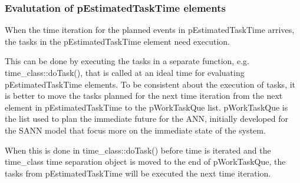 %




	\subsubsection{Evalutation of pEstimatedTaskTime elements}
	\label{ssecEvaluationOfpEstimatedTaskTimeELEMENTS}

	When the time iteration for the planned events in pEstimatedTaskTime arrives, the tasks in the pEstimatedTaskTime element need execution.

	This can be done by executing the tasks in a separate function, e.g. time\_class::doTask(), that is called at an ideal time for evaluating pEstimatedTaskTime elements.
	To be consistent about the execution of tasks, it is better to move the tasks planned for the next time iteration from the next element in pEstimatedTaskTime to the pWorkTaskQue list.
	pWorkTaskQue is the list used to plan the immediate future for the ANN, initially developed for the SANN model that focus more on the immediate state of the system.

	When this is done in time\_class::doTask() before time is iterated and the time\_class time separation object is moved to the end of pWorkTaskQue, the tasks from pEstimatedTaskTime will be executed the next time iteration.

